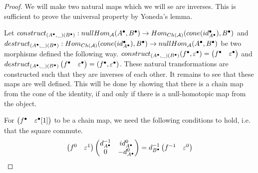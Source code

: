     \begin{proof}
        We will make two natural maps which we will se are inverses. This is sufficient to prove the universal property by Yoneda's lemma.

        Let $construct_{(A^{\bullet},\_)(B^{\bullet})}:nullHom_{\mathcal{A}}(A^{\bullet},B^{\bullet})\rightarrow Hom_{Ch(\mathcal{A})}(cone(id_{A^{\bullet}}^{\bullet}),B^{\bullet})$ and \\$destruct_{(A^{\bullet},\_)(B^{\bullet})}:Hom_{Ch(\mathcal{A})}(cone(id_{A^{\bullet}}^{\bullet}),B^{\bullet})\rightarrow nullHom_{\mathcal{A}}(A^{\bullet},B^{\bullet})$ be two morphisms defined the following way.
        $construct_{(A^{\bullet},\_)(B^{\bullet})}(f^{\bullet},\varepsilon^{\bullet})=\begin{pmatrix}f^{\bullet} & \varepsilon^{\bullet}\end{pmatrix}$ and \\$destruct_{(A^{\bullet},\_)(B^{\bullet})}\begin{pmatrix}f^{\bullet} & \varepsilon^{\bullet}\end{pmatrix} = (f^{\bullet}, \varepsilon^{\bullet})$. These natural transformations are constructed such that they are inverses of each other. It remains to see that these maps are well defined. This will be done by showing that there is a chain map from the cone of the identity, if and only if there is a null-homotopic map from the object.

        \begin{center}
        \end{center}

        For $\begin{pmatrix}f^{\bullet} & \varepsilon^{\bullet}[1]\end{pmatrix}$ to be a chain map, we need the following conditions to hold, i.e. that the square commute.
        \begin{equation*}
            \begin{pmatrix}f^0 & \varepsilon^1 \end{pmatrix}\begin{pmatrix}d^{-1}_{A^{\bullet}} & id^0_{A^{\bullet}} \\ 0 & -d^0_{A^{\bullet}}\end{pmatrix}=d^{-1}_{B^{\bullet}}\begin{pmatrix} f^{-1} & \varepsilon^0 \end{pmatrix}
        \end{equation*}


\end{proof}
